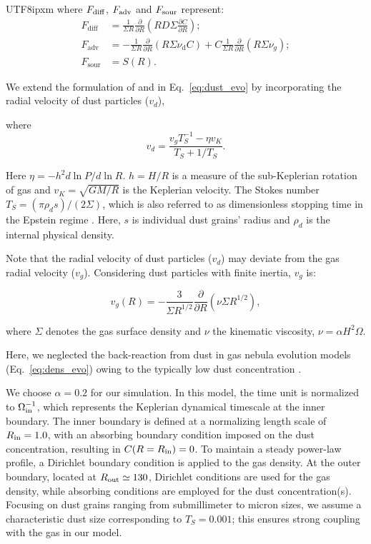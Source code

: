 \documentclass[linenumbers,trackchanges]{aastex701}
\begin{document}
\begin{CJK*}{UTF8}{ipxm}
where $F_{\rm diff}$, $F_{\rm adv}$ and $F_{\rm sour}$ represent: 
\begin{equation}
\begin{aligned}
    F_{\mathrm{diff}} &= \frac{1}{\Sigma R}\frac{\partial}{\partial R}\left(RD\Sigma\frac{\partial C}{\partial R}\right);\\
    F_{\mathrm{adv}} &= -\frac{1}{\Sigma R}\frac{\partial}{\partial R}(R\Sigma\nu_\mathrm{d}C)+C\frac{1}{\Sigma R}\frac{\partial}{\partial R}(R\Sigma\nu_g);\\
    F_{\mathrm{sour}} &= S(R).
    \label{eq:f}
\end{aligned}
\end{equation}

We extend the formulation of \citet{morfill1984} and \citet{clarke1988} in Eq.~\ref{eq:dust_evo} by incorporating the radial velocity of dust particles ($v_d$)\cite{takeuchi2003}, 

where 
\begin{equation}
    v_d = \frac{v_gT_S^{-1}-\eta v_K}{T_S+1/T_S}.
\end{equation}

Here $\eta=-h^2d\ln P/d \ln R$. $h=H/R$ is a measure of the sub-Keplerian rotation of gas and $v_K=\sqrt{GM/R}$ is the Keplerian velocity. The Stokes number $T_S = (\pi \rho_d s)/(2\Sigma)$, which is also referred to as dimensionless stopping time in the Epstein regime \citep{Birnstiel2010}. Here, $s$ is individual dust grains' radius and $\rho_d$ is the internal physical density. 

Note that the radial velocity of dust particles ($v_d$) may deviate from the gas radial velocity ($v_g$). Considering dust particles with finite inertia, $v_g$ is\cite{lynden1974, Armitage2019}:

\begin{equation}
v_g(R) = -\frac{3}{\Sigma R^{1/2}} \frac{\partial}{\partial R} \left( \nu \Sigma R^{1/2}\right),
\end{equation}

where $\Sigma$ denotes the gas surface density and $\nu$ the kinematic viscosity, $\nu=\alpha H^2 \Omega$. 

Here, we neglected the back-reaction from dust in gas nebula evolution models (Eq.~\ref{eq:dens_evo}) owing to the typically low dust concentration \cite{Liu2022}. 

We choose $\alpha=0.2$ for our simulation. In this model, the time unit is normalized to $\Omega_{\rm in}^{-1}$, which represents the Keplerian dynamical timescale at the inner boundary. The inner boundary is defined at a normalizing length scale of $R_{\rm in} = 1.0$, with an absorbing boundary condition imposed on the dust concentration, resulting in $C(R = R_{\rm in}) = 0$. To maintain a steady power-law profile, a Dirichlet boundary condition is applied to the gas density. At the outer boundary, located at $R_{\rm out} \simeq 130$, Dirichlet conditions are used for the gas density, while absorbing conditions are employed for the dust concentration(s). Focusing on dust grains ranging from submillimeter to micron sizes, we assume a characteristic dust size corresponding to $T_S = 0.001$; this ensures strong coupling with the gas in our model.


\end{CJK*}
\end{document}
